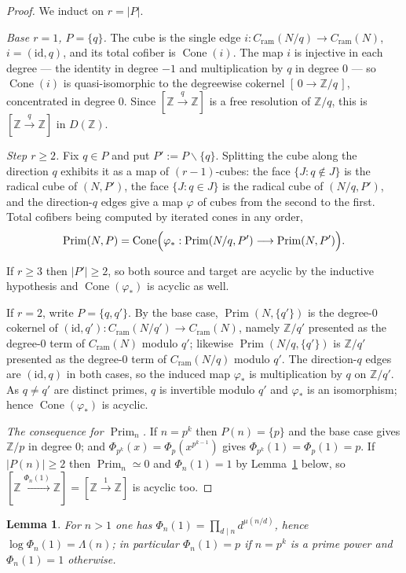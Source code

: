 \documentclass[11pt]{amsart}
\newtheorem{lemma}[theorem]{Lemma}
\theoremstyle{definition}
\theoremstyle{remark}
\newcommand{\Z}{\mathbb Z}
\newcommand{\Prim}{\operatorname{Prim}}
\newcommand{\Cone}{\operatorname{Cone}}
\begin{document}
\begin{proof}
We induct on $r=|P|$.

\emph{Base $r=1$, $P=\{q\}$.} The cube is the single edge
$i:C_{\mathrm{ram}}(N/q)\to C_{\mathrm{ram}}(N)$, $i=(\mathrm{id},q)$, and its
total cofiber is $\Cone(i)$. The map $i$ is injective in each degree --- the
identity in degree $-1$ and multiplication by $q$ in degree $0$ --- so
$\Cone(i)$ is quasi-isomorphic to the degreewise cokernel
$[\,0\to\Z/q\,]$, concentrated in degree $0$. Since
$[\Z\xrightarrow{q}\Z]$ is a free resolution of $\Z/q$, this is
$[\Z\xrightarrow{q}\Z]$ in $D(\Z)$.

\emph{Step $r\ge2$.} Fix $q\in P$ and put $P':=P\smallsetminus\{q\}$. Splitting
the cube along the direction $q$ exhibits it as a map of $(r-1)$-cubes: the
face $\{J:q\notin J\}$ is the radical cube of $(N,P')$, the face
$\{J:q\in J\}$ is the radical cube of $(N/q,P')$, and the direction-$q$ edges
give a map $\varphi$ of cubes from the second to the first. Total cofibers
being computed by iterated cones in any order,
\[
  \Prim(N,P)=\Cone\Bigl(\varphi_*:\Prim(N/q,P')\longrightarrow
   \Prim(N,P')\Bigr).
\]

If $r\ge3$ then $|P'|\ge2$, so both source and target are acyclic by the
inductive hypothesis and $\Cone(\varphi_*)$ is acyclic as well.

If $r=2$, write $P=\{q,q'\}$. By the base case, $\Prim(N,\{q'\})$ is the
degree-$0$ cokernel of $(\mathrm{id},q'):C_{\mathrm{ram}}(N/q')\to
C_{\mathrm{ram}}(N)$, namely $\Z/q'$ presented as the degree-$0$ term of
$C_{\mathrm{ram}}(N)$ modulo $q'$; likewise $\Prim(N/q,\{q'\})$ is $\Z/q'$
presented as the degree-$0$ term of $C_{\mathrm{ram}}(N/q)$ modulo $q'$. The
direction-$q$ edges are $(\mathrm{id},q)$ in both cases, so the induced map
$\varphi_*$ is multiplication by $q$ on $\Z/q'$. As $q\ne q'$ are distinct
primes, $q$ is invertible modulo $q'$ and $\varphi_*$ is an isomorphism;
hence $\Cone(\varphi_*)$ is acyclic.

\emph{The consequence for $\Prim_n$.} If $n=p^k$ then $P(n)=\{p\}$ and the
base case gives $\Z/p$ in degree $0$; and $\Phi_{p^k}(x)=\Phi_p(x^{p^{k-1}})$
gives $\Phi_{p^k}(1)=\Phi_p(1)=p$. If $|P(n)|\ge2$ then $\Prim_n\simeq0$ and
$\Phi_n(1)=1$ by Lemma~\ref{lem:cyclotomicvalue} below, so
$[\Z\xrightarrow{\Phi_n(1)}\Z]=[\Z\xrightarrow{1}\Z]$ is acyclic too.
\end{proof}

\begin{lemma}\label{lem:cyclotomicvalue}
For $n>1$ one has $\Phi_n(1)=\prod_{d\mid n}d^{\mu(n/d)}$, hence
$\log\Phi_n(1)=\Lambda(n)$; in particular $\Phi_n(1)=p$ if $n=p^k$ is a prime
power and $\Phi_n(1)=1$ otherwise.
\end{lemma}
\end{document}
